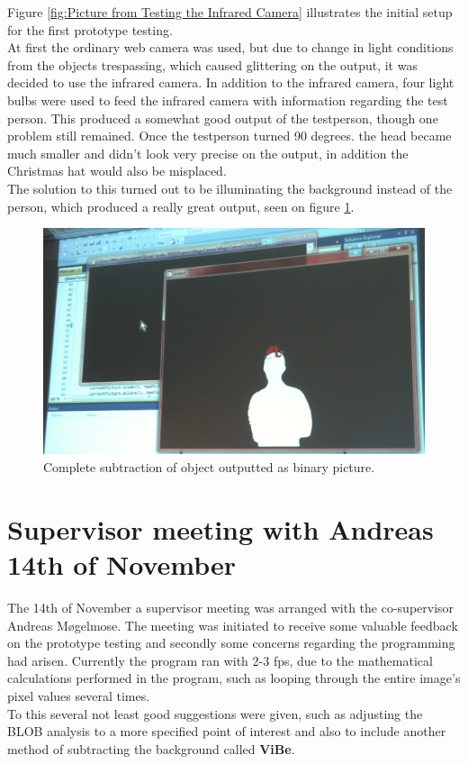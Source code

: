 Figure \ref{fig:Picture from Testing the Infrared Camera}  illustrates the initial setup for the first prototype testing. \\
At first the ordinary web camera was used, but due to change in light conditions from the objects trespassing, which caused glittering on the output, it was decided to use the infrared camera. In addition to the infrared camera, four light bulbs were used to  feed the infrared camera with information regarding the test person. This produced a somewhat good output of the testperson, though one problem still remained. Once the testperson turned 90 degrees. the head became much smaller and didn't look very precise on the output, in addition the Christmas hat would also be misplaced.\\
The solution to this turned out to be illuminating the background instead of the person, which produced a really great output, seen on figure \ref{fig:max_subtracted}.


\begin{figure}[htbp]
\centering
\includegraphics[width=1.00\textwidth]{Pictures/Test/MaxSubtracted.jpg}
\caption{Complete subtraction of object outputted as binary picture.}
\label{fig:max_subtracted}
\end{figure}


\section{Supervisor meeting with Andreas 14th of November}
The 14th of November a supervisor meeting was arranged with the co-supervisor Andreas M{\o}gelmose. The meeting was initiated to receive some valuable feedback on the prototype testing and secondly some concerns regarding the programming had arisen. Currently the program ran with 2-3 fps, due to the mathematical calculations performed in the program, such as looping through the entire image's pixel values several times.\\
To this several not least good suggestions were given, such as adjusting the BLOB analysis to a more specified point of interest and also to include another method of subtracting the background called \textbf{ViBe}.

